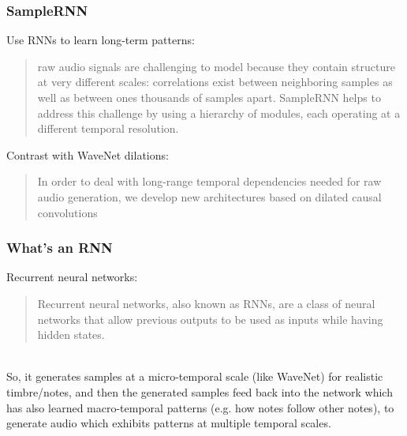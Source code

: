 \documentclass{beamer}
\begin{document}
\begin{frame}
	\frametitle{SampleRNN}
	Use RNNs to learn long-term patterns:\\
	\begin{quote}
		raw audio signals are challenging to model because they contain structure at very different scales: correlations exist between neighboring samples as well as between ones thousands of samples apart. SampleRNN helps to address this challenge by using a hierarchy of modules, each operating at a different temporal resolution.
	\end{quote}
	Contrast with WaveNet dilations:
	\begin{quote}
		In order to deal with long-range temporal dependencies needed for raw audio generation, we develop new architectures based on dilated causal convolutions
	\end{quote}
\end{frame}

\begin{frame}
	\frametitle{What's an RNN}
	Recurrent neural networks:
	\begin{quote}
		Recurrent neural networks, also known as RNNs, are a class of neural networks that allow previous outputs to be used as inputs while having hidden states.
	\end{quote}\\
	So, it generates samples at a micro-temporal scale (like WaveNet) for realistic timbre/notes, and then the generated samples feed back into the network which has also learned macro-temporal patterns (e.g. how notes follow other notes), to generate audio which exhibits patterns at multiple temporal scales.\\
\end{frame}

\end{document}
